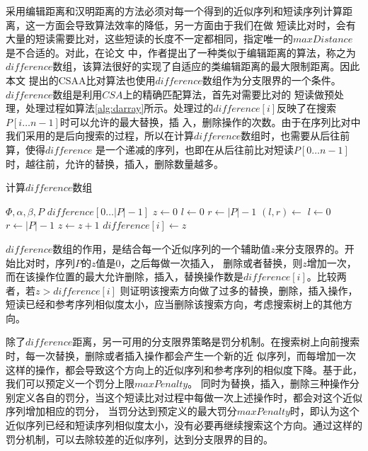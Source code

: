 \documentclass[UTF8,adobefonts]{ctexart}
\begin{document}
采用编辑距离和汉明距离的方法必须对每一个得到的近似序列和短读序列计算距离，这一方面会导致算法效率的降低，另一方面由于我们在做
短读比对时，会有大量的短读需要比对，这些短读的长度不一定都相同，指定唯一的$maxDistance$是不合适的。对此，在论文\cite{li2009fast}
中，作者提出了一种类似于编辑距离的算法，称之为$difference$数组，该算法很好的实现了自适应的类编辑距离的最大限制距离。因此本文
提出的CSAA比对算法也使用$difference$数组作为分支限界的一个条件。$difference$数组是利用$CSA$上的精确匹配算法，首先对需要比对的
短读做预处理，处理过程如算法\ref{alg:darray}所示。处理过的$difference[i]$反映了在搜索$P[i\ldots n-1]$时可以允许的最大替换，插
入，删除操作的次数。由于在序列比对中我们采用的是后向搜索的过程，所以在计算$difference$数组时，也需要从后往前算，使得$difference$
是一个递减的序列，也即在从后往前比对短读$P[0\ldots n-1]$时，越往前，允许的替换，插入，删除数量越多。

\begin{algorithm}
    \caption{计算$difference$数组}
    \label{alg:darray}
    \begin{algorithmic}[1]
        \Require $\Phi,\alpha,\beta,P$
        \Ensure $difference[0\ldots |P|-1]$
            \State $z \gets 0$
            \State $l \gets 0$
            \State $r \gets |P|-1$
                \State $(l,r) \gets$  
                \State $l\gets 0$
                \State $r \gets |P|-1$
                \State $z \gets z+1$
                \EndIf
                \State $difference[i] \gets z$
            \EndFor
        \EndFunction
    \end{algorithmic}
\end{algorithm}

$difference$数组的作用，是结合每一个近似序列的一个辅助值$z$来分支限界的。开始比对时，序列$P$的$z$值是$0$，之后每做一次插入，
删除或者替换，则$z$增加一次，而在该操作位置的最大允许删除，插入，替换操作数是$difference[i]$。比较两者，若$z>difference[i]$
则证明该搜索方向做了过多的替换，删除，插入操作，短读已经和参考序列相似度太小，应当删除该搜索方向，考虑搜索树上的其他方向。

除了$difference$距离，另一可用的分支限界策略是罚分机制\cite{lesk1e21986alignment}。在搜索树上向前搜索时，每一次替换，删除或者插入操作都会产生一个新的近
似序列，而每增加一次这样的操作，都会导致这个方向上的近似序列和参考序列的相似度下降。基于此，我们可以预定义一个罚分上限$maxPenalty$。
同时为替换，插入，删除三种操作分别定义各自的罚分，当这个短读比对过程中每做一次上述操作时，都会对这个近似序列增加相应的罚分，
当罚分达到预定义的最大罚分$maxPenalty$时，即认为这个近似序列已经和短读序列相似度太小，没有必要再继续搜索这个方向。通过这样的
罚分机制，可以去除较差的近似序列，达到分支限界的目的。
\end{document}
